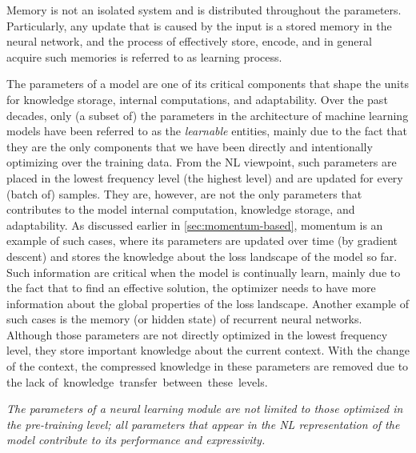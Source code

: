 {\begin{myboxismall}  
    Memory is not an isolated system and is distributed throughout the parameters. Particularly, any update that is caused by the input is a stored memory in the neural network, and the process of effectively store, encode, and in general acquire such memories is referred to as learning process. 
\end{myboxismall}



The parameters of a model are one of its critical components that shape the units for knowledge storage, internal computations, and adaptability. 
Over the past decades, only (a subset of) the parameters in the architecture of machine learning models have been referred to as the \emph{learnable} entities, mainly due to the fact that they are the only components that we have been directly and intentionally optimizing over the training data. From the NL viewpoint, such parameters are placed in the lowest frequency level (the highest level) and are updated for every (batch of) samples. They are, however, are not the only parameters that contributes to the model internal computation, knowledge storage, and adaptability. As discussed earlier in \autoref{sec:momentum-based}, momentum is an example of such cases, where its parameters are updated over time (by gradient descent) and stores the knowledge about the loss landscape of the model so far. Such information are critical when the model is continually learn, mainly due to the fact that to find an effective solution, the optimizer needs to have more information about the global properties of the loss landscape. Another example of such cases is the memory (or hidden state) of recurrent neural networks. Although those parameters are not directly optimized in the lowest frequency level, they store important knowledge about the current context. With the change of the context, the compressed knowledge in these parameters are removed due to the lack of~knowledge~transfer~between~these~levels.    


\begin{myboxismall}  
    \textit{The parameters of a neural learning module are not limited to those optimized in the pre-training level; all parameters that appear in the NL representation of the model contribute to its performance and expressivity.}
\end{myboxismall}


}
